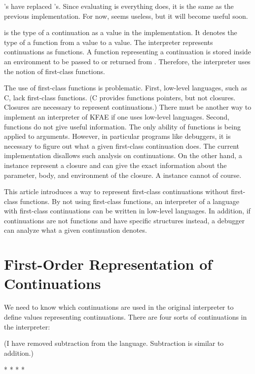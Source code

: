 ’s have replaced ’s. Since evaluating 
is everything  does, it is the same as the previous
implementation. For now,  seems useless, but it will become useful
soon.

 is the type of a continuation as a value in the implementation. It
denotes the type of a function from a value to a value. The interpreter
represents continuations as functions. A function representing a continuation is
stored inside an environment to be passed to  or returned from
. Therefore, the interpreter uses the notion of first-class
functions.

The use of first-class functions is problematic. First, low-level languages, such
as C, lack first-class functions. (C provides functions pointers, but not
closures. Closures are necessary to represent continuations.) There must be
another way to implement an interpreter of KFAE if one uses low-level languages.
Second, functions do not give useful information. The only ability of functions
is being applied to arguments. However, in particular programs like debuggers, it
is necessary to figure out what a given first-class continuation does. The
current implementation disallows such analysis on continuations. On the other
hand, a  instance represent a closure and can give the exact
information about the parameter, body, and environment of the closure. A
 instance cannot of course.

This article introduces a way to represent first-class continuations without
first-class functions. By not using first-class functions, an interpreter of a
language with first-class continuations can be written in low-level languages. In
addition, if continuations are not functions and have specific structures
instead, a debugger can analyze what a given continuation denotes.

\section{First-Order Representation of Continuations}

We need to know which continuations are used in the original interpreter to
define values representing continuations. There are four sorts of continuations
in the interpreter:

(I have removed subtraction from the language. Subtraction is similar to
addition.)

* 
* 
* 
* 

